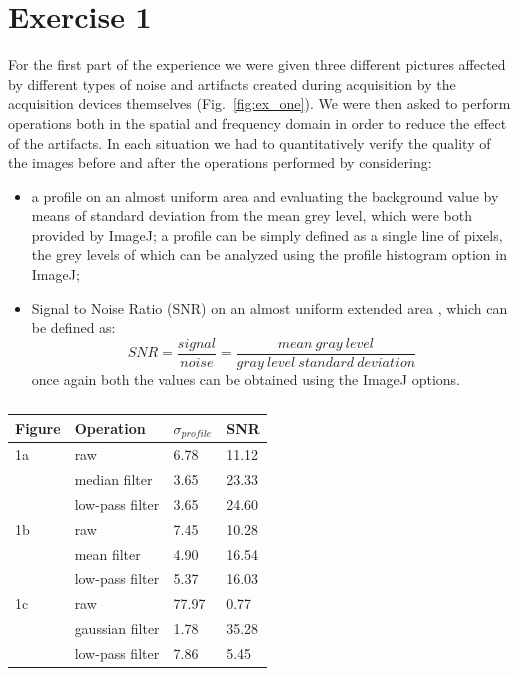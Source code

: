 \documentclass[a4paper]{article}
\begin{document}
\section*{Exercise 1}
For the first part of the experience we were given three different pictures affected by different types of noise and artifacts created during acquisition by the acquisition devices themselves (Fig.~\ref{fig:ex_one}). We were then asked to perform operations both in the spatial and frequency domain in order to reduce the effect of the artifacts. In each situation we had to quantitatively verify the quality of the images before and after the operations performed by considering:
\begin{itemize}
 \item a profile on an almost uniform area and evaluating the background value by means of standard deviation from the mean grey level, which were both provided by ImageJ; a profile can be simply defined as a single line of pixels, the grey levels of which can be analyzed using the profile histogram option in ImageJ;
 \item Signal to Noise Ratio (SNR) on an almost uniform extended area , which can be defined as:
 \begin{equation}
 SNR=\frac{signal}{noise}=\frac{mean\ gray\ level}{gray\ level\ standard\ deviation}
 \end{equation}
 once again both the values can be obtained using the ImageJ options.
\end{itemize}

\begin{table}[h]
	\centering
	\begin{tabular}{| l | l | l | l |}
		\hline
		Figure & Operation & $\sigma_{profile}$ & SNR \\ \hline
		1a & raw & 6.78 & 11.12 \\ \hline
		   & median filter & 3.65 & 23.33 \\ \hline
		   & low-pass filter & 3.65 & 24.60 \\ \hline
		1b & raw & 7.45 & 10.28 \\ \hline
		& mean filter & 4.90 & 16.54 \\ \hline
		& low-pass filter & 5.37 & 16.03 \\ \hline
		1c & raw & 77.97 & 0.77 \\ \hline
		& gaussian filter & 1.78 & 35.28 \\ \hline
		& low-pass filter & 7.86 & 5.45 \\ \hline
	\end{tabular}
	\caption{}
  \label{tab:ex_one}
\end{table}
\end{document}

